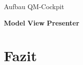 \begin{frame}{Aufbau QM-Cockpit}
\begin{overlayarea}{\textwidth}{.67\textheight}
 \end{overlayarea}
 \begin{block}{\textbf<2>{Model} \textbf<3>{View} \textbf<4>{Presenter}}\end{block}
\end{frame}

\section{Fazit}
